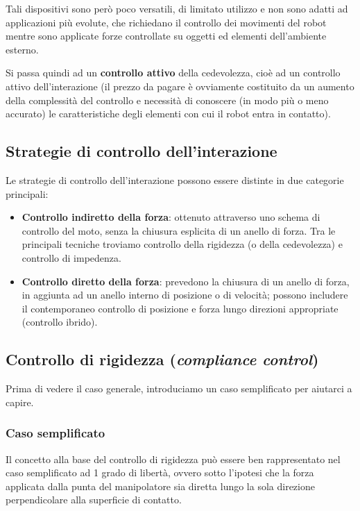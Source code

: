 Tali dispositivi sono però poco versatili, di limitato utilizzo e non sono adatti ad applicazioni più evolute, che richiedano il controllo dei movimenti del robot mentre sono applicate forze controllate su oggetti ed elementi dell’ambiente esterno.

Si passa quindi ad un \textbf{controllo attivo} della cedevolezza, cioè ad un controllo attivo dell’interazione (il prezzo da pagare è ovviamente costituito da un aumento della complessità del controllo e necessità di conoscere (in modo più o meno accurato) le caratteristiche degli elementi con cui il robot entra in contatto).






\subsection{Strategie di controllo dell’interazione}

Le strategie di controllo dell’interazione possono essere distinte in due categorie principali:
\begin{itemize}
	\item \textbf{Controllo indiretto della forza}: ottenuto attraverso uno schema di controllo del moto, senza la chiusura esplicita di un anello di forza. Tra le principali tecniche troviamo controllo della rigidezza (o della cedevolezza) e controllo di impedenza.
	\item \textbf{Controllo diretto della forza}: prevedono la chiusura di un anello di forza, in aggiunta ad un anello interno di posizione o di velocità; possono includere il contemporaneo controllo di posizione e forza lungo direzioni appropriate (controllo ibrido).
\end{itemize}







\subsection{Controllo di rigidezza (\textit{compliance control})}

Prima di vedere il caso generale, introduciamo un caso semplificato per aiutarci a capire.

\subsubsection{Caso semplificato}
Il concetto alla base del controllo di rigidezza può essere ben rappresentato nel caso semplificato ad 1 grado di libertà, ovvero sotto l’ipotesi che la forza applicata dalla punta del manipolatore sia diretta lungo la sola direzione perpendicolare alla superficie di contatto.

